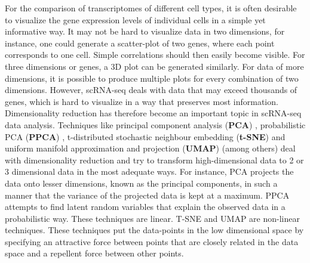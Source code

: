 
For the comparison of transcriptomes of different cell types, it is often desirable to visualize the gene expression levels of individual cells in a simple yet informative way.
It may not be hard to visualize data in two dimensions, for instance, one could generate a scatter-plot of two genes, where each point corresponds to one cell. Simple correlations should then easily become visible. For three dimensions or genes, a 3D plot can be generated similarly. For data of more dimensions, it is possible to produce multiple plots for every combination of two dimensions. However, scRNA-seq deals with data that may exceed thousands of genes, which is hard to visualize in a way that preserves most information. Dimensionality reduction has therefore become an important topic in scRNA-seq data analysis. Techniques like principal component analysis (\textbf{PCA}) \cite{pearson1901liii}, probabilistic PCA (\textbf{PPCA}) \cite{ppca}, t-distributed stochastic neighbour embedding (\textbf{t-SNE}) \cite{maaten2008visualizing} and uniform manifold approximation and projection (\textbf{UMAP}) \cite{mcinnes2018umap, becht2019dimensionality} (among others) deal with dimensionality reduction and try to transform high-dimensional data to 2 or 3 dimensional data in the most adequate ways. For instance, PCA projects the data onto lesser dimensions, known as the principal components, in such a manner that the variance of the projected data is kept at a maximum. PPCA attempts to find latent random variables that explain the observed data in a probabilistic way. These techniques are linear. T-SNE and UMAP are non-linear techniques. These techniques put the data-points in the low dimensional space by specifying an attractive force between points that are closely related in the data space and a repellent force between other points.

